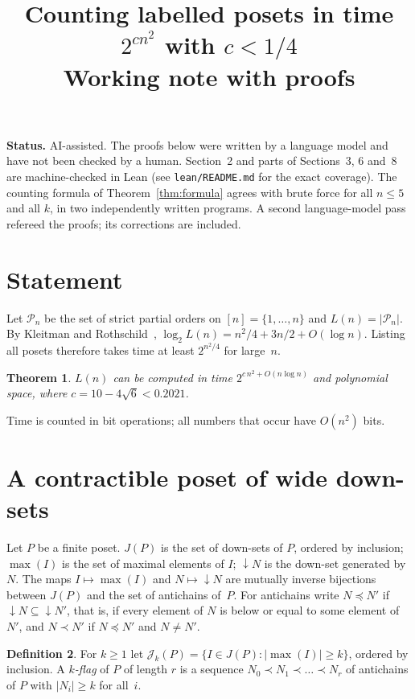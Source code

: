 \documentclass[11pt]{article}
\title{Counting labelled posets in time $2^{c n^2}$ with $c<1/4$\\[2pt]
\large Working note with proofs}
\author{}
\date{}
\newtheorem{theorem}{Theorem}
\theoremstyle{definition}
\newtheorem{definition}[theorem]{Definition}
\theoremstyle{remark}
\newcommand{\dn}{{\downarrow}}
\newcommand{\cP}{\mathcal{P}}
\newcommand{\cJ}{\mathcal{J}}
\begin{document}
\maketitle

\noindent\textbf{Status.} AI-assisted. The proofs below were written by a language
model and have not been checked by a human. Section~2 and parts of Sections~3, 6 and~8 are
machine-checked in Lean (see \texttt{lean/README.md} for the exact coverage). The counting formula of
Theorem~\ref{thm:formula} agrees with brute force for all $n\le 5$ and all $k$, in two
independently written programs. A second language-model pass refereed the proofs; its
corrections are included.

\section{Statement}

Let $\cP_n$ be the set of strict partial orders on $[n]=\{1,\dots,n\}$ and $L(n)=|\cP_n|$.
By Kleitman and Rothschild~\cite{KR75}, $\log_2 L(n) = n^2/4 + 3n/2 + O(\log n)$. Listing
all posets therefore takes time at least $2^{n^2/4}$ for large~$n$.

\begin{theorem}\label{thm:main}
$L(n)$ can be computed in time $2^{c\,n^2+O(n\log n)}$ and polynomial space, where
$c = 10-4\sqrt6 < 0.2021$.
\end{theorem}

Time is counted in bit operations; all numbers that occur have $O(n^2)$ bits.

\section{A contractible poset of wide down-sets}

Let $P$ be a finite poset. $J(P)$ is the set of down-sets of $P$, ordered by inclusion;
$\max(I)$ is the set of maximal elements of $I$; $\dn N$ is the down-set generated by~$N$.
The maps $I\mapsto\max(I)$ and $N\mapsto\dn N$ are mutually inverse bijections between
$J(P)$ and the set of antichains of~$P$. For antichains write $N\preceq N'$ if
$\dn N\subseteq\dn N'$, that is, if every element of $N$ is below or equal to some element
of~$N'$, and $N\prec N'$ if $N\preceq N'$ and $N\ne N'$.

\begin{definition}
For $k\ge1$ let $\cJ_k(P)=\{I\in J(P): |\max(I)|\ge k\}$, ordered by inclusion.
A \emph{$k$-flag} of $P$ of length $r$ is a sequence $N_0\prec N_1\prec\dots\prec N_r$ of
antichains of $P$ with $|N_i|\ge k$ for all~$i$.
\end{definition}
\end{document}
